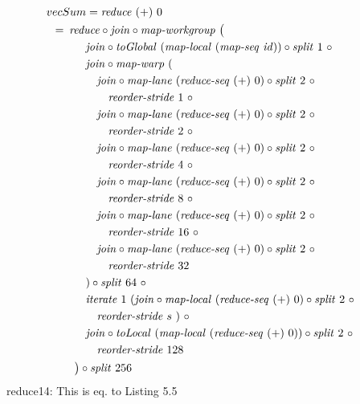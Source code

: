 \begin{align}
  &\hspace{-1.5em}vecSum = \reduce\ (+)\ 0\nonumber\\
  &\hspace{-2em}\quad\begin{aligned}
    &=\hspace{.2em}
      \reduce \circ \join \circ \mapWorkgroup\ \big(\\
    &\qquad\quad \join \circ \toGlobal\ (\mapLocal\ (\mapSeq\ \id)) \circ \splitN\ 1\ \circ\\
    &\qquad\quad \join \circ \mapWarp\ (\\
    &\qquad\qquad \join \circ \mapLane\ (\reduceSeq\ (+)\ 0) \circ \splitN\ 2\ \circ\\
    &\qquad\qquad\quad \reorderStride\ 1\ \circ\\
    &\qquad\qquad \join \circ \mapLane\ (\reduceSeq\ (+)\ 0) \circ \splitN\ 2\ \circ\\
    &\qquad\qquad\quad \reorderStride\ 2\ \circ\\
    &\qquad\qquad \join \circ \mapLane\ (\reduceSeq\ (+)\ 0) \circ \splitN\ 2\ \circ\\
    &\qquad\qquad\quad \reorderStride\ 4\ \circ\\
    &\qquad\qquad \join \circ \mapLane\ (\reduceSeq\ (+)\ 0) \circ \splitN\ 2\ \circ\\
    &\qquad\qquad\quad \reorderStride\ 8\ \circ\\
    &\qquad\qquad \join \circ \mapLane\ (\reduceSeq\ (+)\ 0) \circ \splitN\ 2\ \circ\\
    &\qquad\qquad\quad \reorderStride\ 16\ \circ\\
    &\qquad\qquad \join \circ \mapLane\ (\reduceSeq\ (+)\ 0) \circ \splitN\ 2\ \circ\\
    &\qquad\qquad\quad \reorderStride\ 32\\
    &\qquad\quad) \circ \splitN\ 64\ \circ\\
    &\qquad\quad \iterateN\ 1\ (\join \circ \mapLocal\ (\reduceSeq\ (+)\ 0) \circ \splitN\ 2\ \circ\\
    &\qquad\qquad \reorderStride\ s\ )\ \circ\\
    &\qquad\quad \join \circ \toLocal\ (\mapLocal\ (\reduceSeq\ (+)\ 0)) \circ \splitN\ 2\ \circ\\
    &\qquad\qquad \reorderStride\ 128\\
    &\qquad\big) \circ \splitN\ 256
  \end{aligned}
\end{align}
reduce14: This is eq. to Listing 5.5












